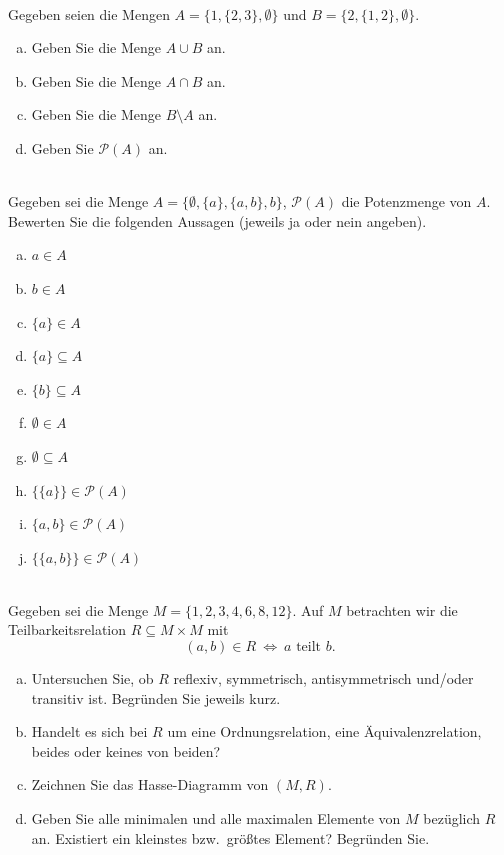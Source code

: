 \newcommand{\printpraesenzlsg}{false}
\newcommand{\printloesungen}{false}
\newcommand{\printbewertungen}{false}
\newcommand{\blattnummer}{1}

\usepackage{booktabs}



\iforiginal{}
\\
Gegeben seien die Mengen $A=\{1,\{2,3\},\emptyset\}$ und $B=\{2,\{1,2\},\emptyset\}$.
\begin{enumerate}[(a)]
\item Geben Sie die Menge $A\cup B$ an.
\item Geben Sie die Menge $A\cap B$ an.
\item Geben Sie die Menge $B\setminus A$ an.
\item Geben Sie $\mathscr{P}(A)$ an.
\end{enumerate}

\\
Gegeben sei die Menge $A=\{\emptyset,\{a\},\{a,b\},b\}$, $\mathscr{P}(A)$ die Potenzmenge von $A$. Bewerten Sie die folgenden Aussagen (jeweils ja oder nein angeben).
\begin{enumerate}[(a)]
\item $a\in A$
\item $b\in A$
\item $\{a\}\in A$
\item $\{a\}\subseteq A$
\item $\{b\}\subseteq A$
\item $\emptyset\in A$
\item $\emptyset\subseteq A$
\item $\{\{a\}\}\in\mathscr{P}(A)$
\item $\{a,b\}\in\mathscr{P}(A)$
\item $\{\{a,b\}\}\in\mathscr{P}(A)$
\end{enumerate}

\\
Gegeben sei die Menge $M=\{1,2,3,4,6,8,12\}$. Auf $M$ betrachten wir die Teilbarkeitsrelation $R\subseteq M\times M$ mit
\[(a,b)\in R \ \Leftrightarrow\ a \text{ teilt } b.\]
\begin{enumerate}[(a)]
    \item Untersuchen Sie, ob $R$ reflexiv, symmetrisch, antisymmetrisch und/oder transitiv ist. Begründen Sie jeweils kurz.
    \item Handelt es sich bei $R$ um eine Ordnungsrelation, eine Äquivalenzrelation, beides oder keines von beiden?
    \item Zeichnen Sie das Hasse-Diagramm von $(M,R)$.
    \item Geben Sie alle minimalen und alle maximalen Elemente von $M$ bezüglich $R$ an. Existiert ein kleinstes bzw.\ größtes Element? Begründen Sie.
\end{enumerate}

